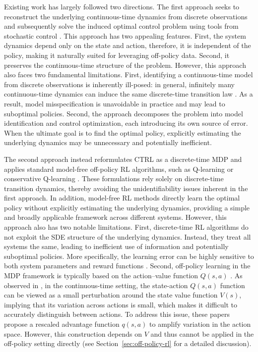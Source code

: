 \documentclass[12pt]{article}
\begin{document}
Existing work has largely followed two directions. The first approach seeks to reconstruct the underlying continuous-time dynamics from discrete observations and subsequently solve the induced optimal control problem using tools from stochastic control \citep{pmlr-v125-agarwal20b,pmlr-v139-yildiz21a,yang2014reinforcement,kamalapurkar2016model}. This approach has two appealing features. First, the system dynamics depend only on the state and action, therefore, it is independent of the policy, making it naturally suited for leveraging off-policy data. Second, it preserves the continuous-time structure of the problem. However, this approach also faces two fundamental limitations. First, identifying a continuous-time model from discrete observations is inherently ill-posed: in general, infinitely many continuous-time dynamics can induce the same discrete-time transition law \citep{zhu2025optimal}. As a result, model misspecification is unavoidable in practice and may lead to suboptimal policies. Second, the approach decomposes the problem into model identification and control optimization, each introducing its own source of error. When the ultimate goal is to find the optimal policy, explicitly estimating the underlying dynamics may be unnecessary and potentially inefficient.


The second approach instead reformulates CTRL as a discrete-time MDP and applies standard model-free off-policy RL algorithms, such as Q-learning or conservative Q-learning \citep{watkins1992q,kumar2020conservative}. These formulations rely solely on discrete-time transition dynamics, thereby avoiding the unidentifiability issues inherent in the first approach. In addition, model-free RL methods directly learn the optimal policy without explicitly estimating the underlying dynamics, providing a simple and broadly applicable framework across different systems. However, this approach also has two notable limitations. First, discrete-time RL algorithms do not exploit the SDE structure of the underlying dynamics. Instead, they treat all systems the same, leading to inefficient use of information and potentially suboptimal policies. More specifically, the learning error can be highly sensitive to both system parameters and reward functions \citep{zhu2025optimal}. Second, off-policy learning in the MDP framework is typically based on the action–value function $Q(s,a)$ \citep{watkins1992q}. As observed in \citep{jia2023q, tallec2019making, baird1994reinforcement}, in the continuous-time setting, the state-action $Q(s,a)$ function can be viewed as a small perturbation around the state value function $V(s)$, implying that its variation across actions is small, which makes it difficult to accurately distinguish between actions. To address this issue, these papers propose a rescaled advantage function $q(s,a)$ to amplify variation in the action space. However, this construction depends on $V$ and thus cannot be applied in the off-policy setting directly (see Section~\ref{sec:off-policy-rl} for a detailed discussion).
\end{document}
